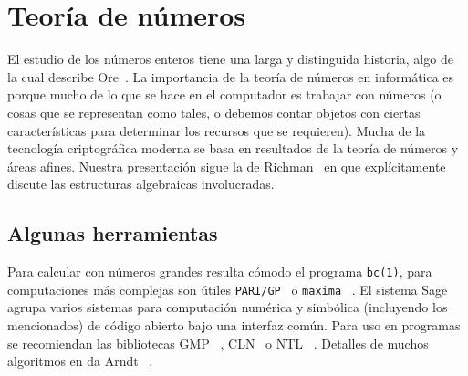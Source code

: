 %

\chapter{Teoría de números}
\label{cha:teoria-numeros}

  El estudio de los números enteros tiene una larga y distinguida historia,
  algo de la cual describe Ore~\cite{ore69:_invit_number_theo}.
  La importancia de la teoría de números en informática
  es porque mucho de lo que se hace en el computador
  es trabajar con números
  (o cosas que se representan como tales,
   o debemos contar objetos con ciertas características
   para determinar los recursos que se requieren).
  Mucha de la tecnología criptográfica moderna%
  se basa en resultados de la teoría de números
  y áreas afines.
  Nuestra presentación sigue la de Richman~%
    \cite{richman71:_number_theor}
  en que explícitamente discute las estructuras algebraicas involucradas.

\section{Algunas herramientas}
\label{sec:algunas-herramientas}

  Para calcular con números grandes
  resulta cómodo el programa \texttt{bc(1)},%
  para computaciones más complejas
  son útiles \texttt{PARI/GP}~%
    \cite{PARI:2.7.2}%
  o \texttt{maxima}~%
    \cite{maxima14b:_computer_algebra}.%
  El sistema Sage~\cite{stein14:_Sage-6.3}%
  agrupa varios sistemas para computación numérica y simbólica
  (incluyendo los mencionados)
  de código abierto bajo una interfaz común.%
  Para uso en programas se recomiendan las bibliotecas GMP~%
    \cite{granlund14:_gnu_multip_precis_arith_librar},%
 CLN~%
    \cite{haible14:_CLN_1.3.4}%
  o NTL~%
    \cite{shoup14:_ntl}.%
  Detalles de muchos algoritmos en \cplusplus{}%
  da Arndt~%
    \cite{arndt11:_matters_computational}.

